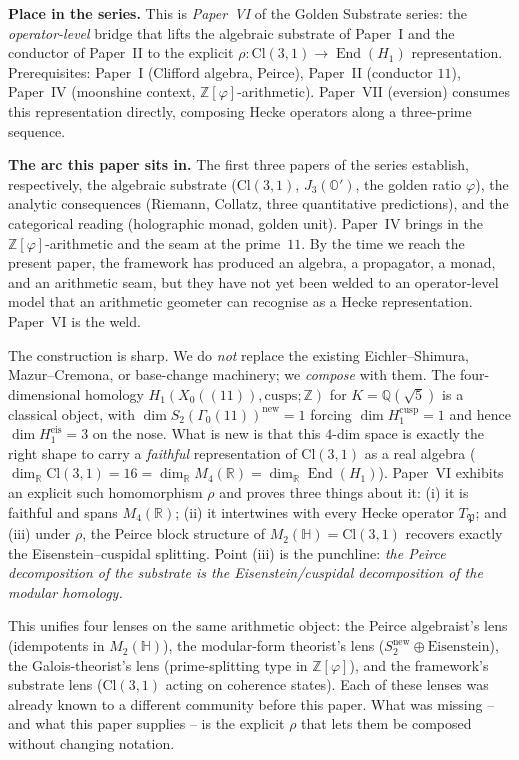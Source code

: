 \documentclass[11pt,a4paper]{article}
\theoremstyle{plain}
\theoremstyle{definition}
\theoremstyle{remark}
\numberwithin{equation}{section}
\providecommand{\Cl}{\mathrm{Cl}}
\providecommand{\R}{\mathbb{R}}
\providecommand{\Z}{\mathbb{Z}}
\providecommand{\Q}{\mathbb{Q}}
\providecommand{\HH}{\mathbb{H}}
\providecommand{\Os}{\mathbb{O}'}
\providecommand{\ZZ}{\mathbb{Z}}
\providecommand{\vp}{\varphi}
\providecommand{\fP}{\mathfrak{P}}
\DeclareMathOperator{\End}{End}
\begin{document}
\medskip
\noindent\textbf{Place in the series.}
This is \emph{Paper~VI} of the Golden Substrate series: the
\emph{operator-level} bridge that lifts the algebraic substrate of
Paper~I and the conductor of Paper~II to the explicit
$\rho:\Cl(3,1)\to\End(H_{1})$ representation.  Prerequisites:
Paper~I (Clifford algebra, Peirce), Paper~II (conductor $11$),
Paper~IV (moonshine context, $\Z[\vp]$-arithmetic).  Paper~VII
(eversion) consumes this representation directly, composing Hecke
operators along a three-prime sequence.

\medskip
\noindent\textbf{The arc this paper sits in.}
The first three papers of the series establish, respectively, the
algebraic substrate ($\Cl(3,1)$, $J_{3}(\Os)$, the golden ratio
$\vp$), the analytic consequences (Riemann, Collatz, three
quantitative predictions), and the categorical reading
(holographic monad, golden unit).  Paper~IV brings in the
$\Z[\vp]$-arithmetic and the seam at the prime~$11$.  By the time
we reach the present paper, the framework has produced an
algebra, a propagator, a monad, and an arithmetic seam, but they
have not yet been welded to an operator-level model that an
arithmetic geometer can recognise as a Hecke representation.
Paper~VI is the weld.

The construction is sharp.  We do \emph{not} replace the existing
Eichler--Shimura, Mazur--Cremona, or base-change machinery; we
\emph{compose} with them.  The four-dimensional homology
$H_{1}(X_{0}((11)),\mathrm{cusps}; \ZZ)$ for $K = \Q(\sqrt 5)$ is
a classical object, with $\dim S_{2}(\Gamma_{0}(11))^{\mathrm{new}} = 1$
forcing $\dim H_{1}^{\mathrm{cusp}} = 1$ and hence
$\dim H_{1}^{\mathrm{eis}} = 3$ on the nose.  What is new is that
this $4$-dim space is exactly the right shape to carry a
\emph{faithful} representation of $\Cl(3,1)$ as a real algebra
($\dim_{\R}\Cl(3,1) = 16 = \dim_{\R}M_{4}(\R) = \dim_{\R}\End(H_{1})$).
Paper~VI exhibits an explicit such homomorphism $\rho$ and proves
three things about it: (i) it is faithful and spans $M_{4}(\R)$;
(ii) it intertwines with every Hecke operator $T_\fP$; and (iii)
under $\rho$, the Peirce block structure of $M_{2}(\HH) =
\Cl(3,1)$ recovers exactly the Eisenstein--cuspidal splitting.
Point (iii) is the punchline: \emph{the Peirce decomposition of
the substrate is the Eisenstein/cuspidal decomposition of the
modular homology.}

This unifies four lenses on the same arithmetic object: the
Peirce algebraist's lens (idempotents in $M_{2}(\HH)$), the
modular-form theorist's lens
($S_{2}^{\mathrm{new}}\oplus\text{Eisenstein}$), the
Galois-theorist's lens (prime-splitting type in $\Z[\vp]$), and
the framework's substrate lens ($\Cl(3,1)$ acting on coherence
states).  Each of these lenses was already known to a different
community before this paper.  What was missing -- and what this
paper supplies -- is the explicit $\rho$ that lets them be
composed without changing notation.
\end{document}
